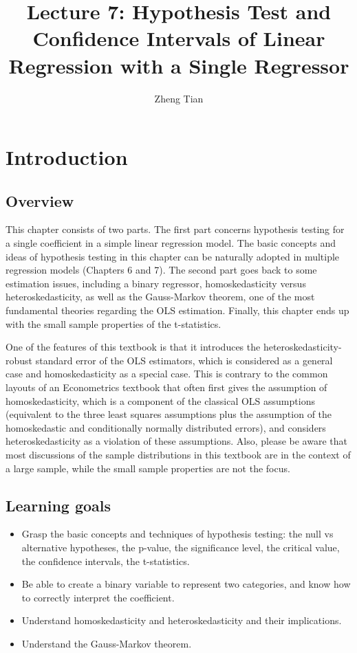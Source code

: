 \documentclass[a4paper,11pt]{article}
\author{Zheng Tian}
\date{}
\title{Lecture 7: Hypothesis Test and Confidence Intervals of Linear Regression with a Single Regressor}
\begin{document}
\maketitle
\setcounter{tocdepth}{1}
\tableofcontents



\section{Introduction}
\label{sec:org3d83c1b}
\subsection{Overview}
\label{sec:orgd91a752}
This chapter consists of two parts. The first part concerns hypothesis
testing for a single coefficient in a simple linear regression
model. The basic concepts and ideas of hypothesis testing in this
chapter can be naturally adopted in multiple regression models
(Chapters 6 and 7). The second part goes back to some estimation
issues, including a binary regressor, homoskedasticity versus
heteroskedasticity, as well as the Gauss-Markov theorem, one of the
most fundamental theories regarding the OLS estimation. Finally,
this chapter ends up with the small sample properties of the
t-statistics.

One of the features of this textbook is that it introduces the
heteroskedasticity-robust standard error of the OLS estimators, which
is considered as a general case and homoskedasticity as a special
case. This is contrary to the common layouts of an Econometrics
textbook that often first gives the assumption of homoskedasticity,
which is a component of the classical OLS assumptions (equivalent to
the three least squares assumptions plus the assumption of the
homoskedastic and conditionally normally distributed errors), 
and considers heteroskedasticity as a violation of these
assumptions. Also, please be aware that most discussions of the sample
distributions in this textbook are in the context of a large sample,
while the small sample properties are not the focus.

\subsection{Learning goals}
\label{sec:orgc86992d}
\begin{itemize}
\item Grasp the basic concepts and techniques of hypothesis testing: the
null vs alternative hypotheses, the p-value, the significance level,
the critical value, the confidence intervals, the t-statistics.
\item Be able to create a binary variable to represent two categories, and
know how to correctly interpret the coefficient.
\item Understand homoskedasticity and heteroskedasticity and their
implications.
\item Understand the Gauss-Markov theorem.
\end{itemize}
\end{document}
